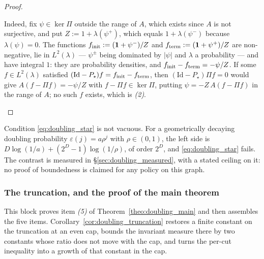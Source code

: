 \begin{proof}
\begin{itemize}
    Indeed, fix $\psi\in\ker\Pi$ outside the range of $A$, which exists since $A$ is not
    surjective, and put $Z:=1+\lambda(\psi^+)$, which equals $1+\lambda(\psi^-)$
    because $\lambda(\psi)=0$. The functions $f_{\mathrm{init}}:=(\mathbf 1+\psi^-)/Z$ and
    $f_{\mathrm{term}}:=(\mathbf 1+\psi^+)/Z$ are non-negative, lie in $L^2(\lambda)$ --- $\psi^\pm$ being
    dominated by $|\psi|$ and $\lambda$ a probability --- and have integral $1$: they are
    probability densities, and $f_{\mathrm{init}}-f_{\mathrm{term}}=-\psi/Z$. If some $f\in L^2(\lambda)$ satisfied
    $(\mathrm{Id}-P_\star)f=f_{\mathrm{init}}-f_{\mathrm{term}}$, then $(\mathrm{Id}-P_\star)\Pi f=0$ would give
    $A(f-\Pi f)=-\psi/Z$ with $f-\Pi f\in\ker\Pi$, putting $\psi=-Z\,A(f-\Pi f)$ in the range of
    $A$; no such $f$ exists, which is \emph{(2)}.
\end{itemize}
\end{proof}

\begin{remark}\label{rem:doubling_geometric}
Condition \eqref{eq:doubling_star} is not vacuous. For a geometrically decaying doubling
probability $\varepsilon(j)=a\rho^j$ with $\rho\in(0,1)$, the left side is
$D\log(1/a)+(2^D-1)\log(1/\rho)$, of order $2^D$, and \eqref{eq:doubling_star} fails. The
contrast is measured in \S\ref{sec:doubling_measured}, with a stated ceiling on it: no proof
of boundedness is claimed for any policy on this graph.
\end{remark}

\subsubsection{The truncation, and the proof of the main theorem}

This block proves item \emph{(5)} of Theorem~\ref{theo:doubling_main} and then assembles the
five items. Corollary~\ref{cor:doubling_truncation} restores a finite constant on the
truncation at an even cap, bounds the invariant measure there by two constants whose ratio does
not move with the cap, and turns the per-cut inequality into a growth of that constant in the
cap.

